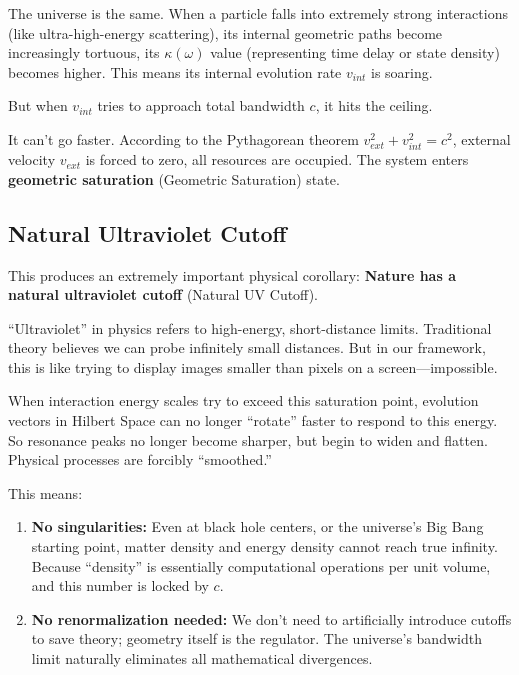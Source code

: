 The universe is the same. When a particle falls into extremely strong interactions (like ultra-high-energy scattering), its internal geometric paths become increasingly tortuous, its $\kappa(\omega)$ value (representing time delay or state density) becomes higher. This means its internal evolution rate $v_{int}$ is soaring.

But when $v_{int}$ tries to approach total bandwidth $c$, it hits the ceiling.

It can't go faster. According to the Pythagorean theorem $v_{ext}^2 + v_{int}^2 = c^2$, external velocity $v_{ext}$ is forced to zero, all resources are occupied. The system enters \textbf{geometric saturation} (Geometric Saturation) state.

\subsection{Natural Ultraviolet Cutoff}

This produces an extremely important physical corollary: \textbf{Nature has a natural ultraviolet cutoff} (Natural UV Cutoff).

``Ultraviolet'' in physics refers to high-energy, short-distance limits. Traditional theory believes we can probe infinitely small distances. But in our framework, this is like trying to display images smaller than pixels on a screen---impossible.

When interaction energy scales try to exceed this saturation point, evolution vectors in Hilbert Space can no longer ``rotate'' faster to respond to this energy. So resonance peaks no longer become sharper, but begin to widen and flatten. Physical processes are forcibly ``smoothed.''

This means:

\begin{enumerate}
\item \textbf{No singularities:} Even at black hole centers, or the universe's Big Bang starting point, matter density and energy density cannot reach true infinity. Because ``density'' is essentially computational operations per unit volume, and this number is locked by $c$.

\item \textbf{No renormalization needed:} We don't need to artificially introduce cutoffs to save theory; geometry itself is the regulator. The universe's bandwidth limit naturally eliminates all mathematical divergences.
\end{enumerate}

